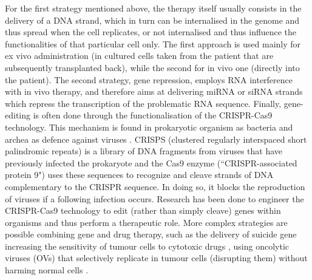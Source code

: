 For the first strategy mentioned above, the therapy itself usually consists in the delivery of a DNA strand, which in turn can be internalised in the genome and thus spread when the cell replicates, or not internalised and thus influence the functionalities of that particular cell only. The first approach is used mainly for ex vivo administration (in cultured cells taken from the patient that are subsequently transplanted back), while the second for in vivo one (directly into the patient).
%
The second strategy, gene repression, employs RNA interference with in vivo therapy, and therefore aims at delivering miRNA or siRNA strands which repress the transcription of the problematic RNA sequence.
%
Finally, gene-editing is often done through the functionalisation of the CRISPR-Cas9 technology. This mechanism is found in prokaryotic organism as bacteria and archea as defence against viruses \cite{Barrangou2015}.
CRISPS (clustered regularly interspaced short palindromic repeats) is a library of DNA fragments from viruses that have previously infected the prokaryote and the Cas9 enzyme (``CRISPR-associated protein 9") uses these sequences to recognize and cleave strands of DNA complementary to the CRISPR sequence. In doing so, it blocks the reproduction of viruses if a following infection occurs. Research has been done to engineer the CRISPR-Cas9 technology to edit (rather than simply cleave) genes within organisms \cite{Zhang2014cas,Shu2014} and thus perform a therapeutic role.
More complex strategies are possible combining gene and drug therapy, such as the delivery of suicide gene increasing the sensitivity of tumour cells to cytotoxic drugs \cite{Oldfield1993},
using oncolytic viruses (OVs) that selectively replicate in tumour cells (disrupting them) without harming normal cells \cite{Lawler2017}.

